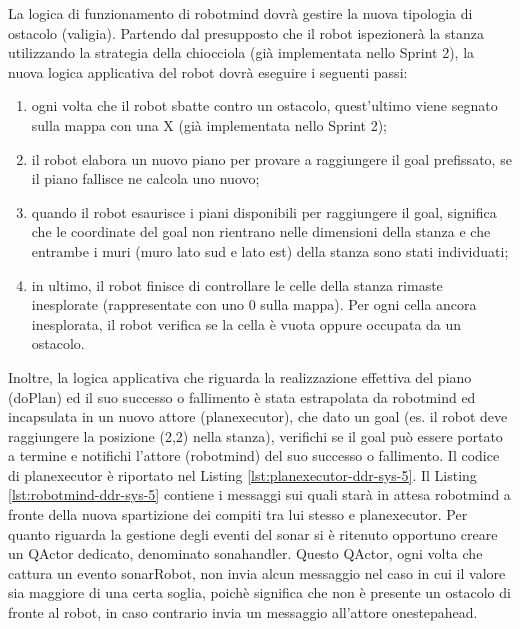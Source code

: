 La logica di funzionamento di robotmind dovrà gestire la nuova tipologia di ostacolo (valigia). Partendo dal presupposto che il robot ispezionerà la stanza utilizzando la strategia della chiocciola (già implementata nello Sprint 2), la nuova logica applicativa del robot dovrà eseguire i seguenti passi:
\begin{enumerate}
\item  ogni volta che il robot sbatte contro un ostacolo, quest'ultimo viene segnato sulla mappa con una X (già implementata nello Sprint 2);
\item il robot elabora un nuovo piano per provare a raggiungere il goal prefissato, se il piano fallisce ne calcola uno nuovo;
\item quando il robot esaurisce i piani disponibili  per raggiungere il goal, significa che le coordinate del goal non rientrano nelle dimensioni della stanza e che entrambe i muri (muro lato sud e lato est) della stanza sono stati individuati;
\item in ultimo, il robot finisce di controllare le celle della stanza rimaste inesplorate (rappresentate con uno 0 sulla mappa). Per ogni cella ancora inesplorata, il robot verifica se la cella è vuota oppure occupata da un ostacolo. \end{enumerate}

Inoltre, la logica applicativa che riguarda la realizzazione effettiva del piano (doPlan) ed il suo successo o fallimento è stata estrapolata da robotmind ed incapsulata in un nuovo attore (planexecutor), che dato un goal (es. il robot deve raggiungere la posizione (2,2) nella stanza), verifichi se il goal può essere portato a termine e notifichi l'attore (robotmind) del suo successo o fallimento. Il codice di planexecutor è riportato nel Listing \ref{lst:planexecutor-ddr-sys-5}. Il Listing \ref{lst:robotmind-ddr-sys-5} contiene i messaggi sui quali starà in attesa robotmind a fronte della nuova spartizione dei compiti tra lui stesso e planexecutor.
Per quanto riguarda la gestione degli eventi del sonar si è ritenuto opportuno creare un QActor dedicato, denominato sonahandler. Questo QActor, ogni volta che cattura un evento sonarRobot, non invia alcun messaggio nel caso in cui il valore sia maggiore di una certa soglia, poichè significa che non è presente un ostacolo di fronte al robot, in caso contrario invia un messaggio all'attore onestepahead. 

